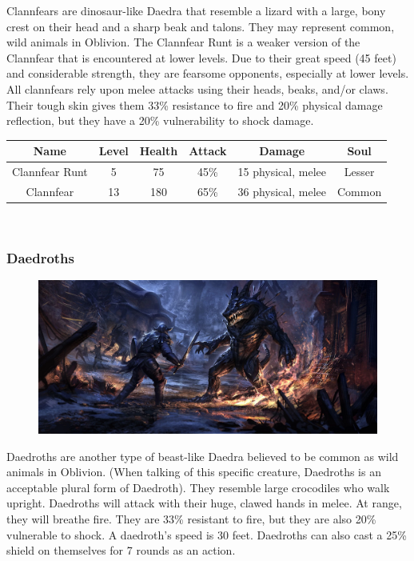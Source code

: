 \documentclass[12pt]{book}
\begin{document}
Clannfears are dinosaur-like Daedra that resemble a lizard with a large, bony crest on their head and a sharp beak and talons. They may represent common, wild animals in Oblivion. The Clannfear Runt is a weaker version of the Clannfear that is encountered at lower levels. Due to their great speed (45 feet) and considerable strength, they are fearsome opponents, especially at lower levels. All clannfears rely upon melee attacks using their heads, beaks, and/or claws. Their tough skin gives them 33\% resistance to fire and 20\% physical damage reflection, but they have a 20\% vulnerability to shock damage.\\

\begin{tabular}{|c|c|c|c|c|c|}
\hline
Name & Level & Health & Attack & Damage & Soul\\ \hline
Clannfear Runt & 5 & 75 & 45\% & 15 physical, melee & Lesser\\ \hline
Clannfear & 13 & 180 & 65\% & 36 physical, melee & Common\\ \hline
\end{tabular}\\

\subsubsection{Daedroths}

\begin{figure}[h]
	\centering
	\includegraphics[scale=0.6]{daedroth.png}
\end{figure}

Daedroths are another type of beast-like Daedra believed to be common as wild animals in Oblivion. (When talking of this specific creature, Daedroths is an acceptable plural form of Daedroth). They resemble large crocodiles who walk upright. Daedroths will attack with their huge, clawed hands in melee. At range, they will breathe fire. They are 33\% resistant to fire, but they are also 20\% vulnerable to shock. A daedroth's speed is 30 feet. Daedroths can also cast a 25\% shield on themselves for 7 rounds as an action.
\end{document}
